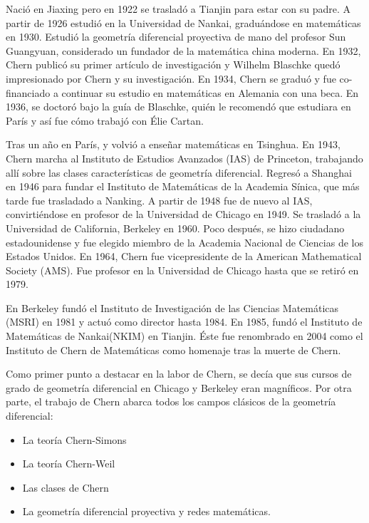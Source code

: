\documentclass[a4paper, 11pt]{article}
\begin{document}
		Nació en Jiaxing pero en 1922 se trasladó a Tianjin para estar con su padre. A partir de 1926 estudió en la
		Universidad de Nankai, graduándose en matemáticas en 1930. Estudió la geometría diferencial proyectiva de mano
		del profesor Sun Guangyuan, considerado un fundador de la matemática china moderna. En 1932, Chern publicó su
		primer artículo de investigación y Wilhelm Blaschke quedó impresionado por Chern y su investigación. En 1934,
		Chern se graduó y fue co-financiado a continuar su estudio en matemáticas en Alemania con una beca. En 1936, se
		doctoró bajo la guía de Blaschke, quién le recomendó que estudiara en París y así fue cómo trabajó con Élie Cartan.
		
		Tras un año en París, y volvió a enseñar matemáticas en Tsinghua. En 1943, Chern marcha al Instituto de Estudios
		Avanzados (IAS) de Princeton, trabajando allí sobre las clases características de geometría diferencial. Regresó
		a Shanghai en 1946 para fundar el Instituto de Matemáticas de la Academia Sínica, que más tarde fue trasladado a
		Nanking. A partir de 1948 fue de nuevo al IAS, convirtiéndose en profesor de la Universidad de Chicago en 1949.
		Se trasladó a la Universidad de California, Berkeley en 1960. Poco después, se hizo ciudadano estadounidense y
		fue elegido miembro de la Academia Nacional de Ciencias de los Estados Unidos. En 1964, Chern fue vicepresidente
		de la American Mathematical Society (AMS). Fue profesor en la Universidad de Chicago hasta que se retiró en 1979.
		 
		En Berkeley fundó el Instituto de Investigación de las Ciencias Matemáticas (MSRI) en 1981 y actuó como director
		hasta 1984. En 1985, fundó el Instituto de Matemáticas de Nankai(NKIM) en Tianjin. Éste fue renombrado en 2004
		como el Instituto de Chern de Matemáticas como homenaje tras la muerte de Chern.
		
		Como primer punto a destacar en la labor de Chern, se decía que sus cursos de grado de geometría diferencial en
		Chicago y Berkeley eran magníficos. Por otra parte, el trabajo de Chern abarca todos los campos clásicos de la
		geometría diferencial:
		\begin{itemize}
			\item La teoría Chern-Simons
			\item La teoría Chern-Weil
			\item Las clases de Chern
			\item La geometría diferencial proyectiva y redes matemáticas.
		\end{itemize}
		
\end{document}
